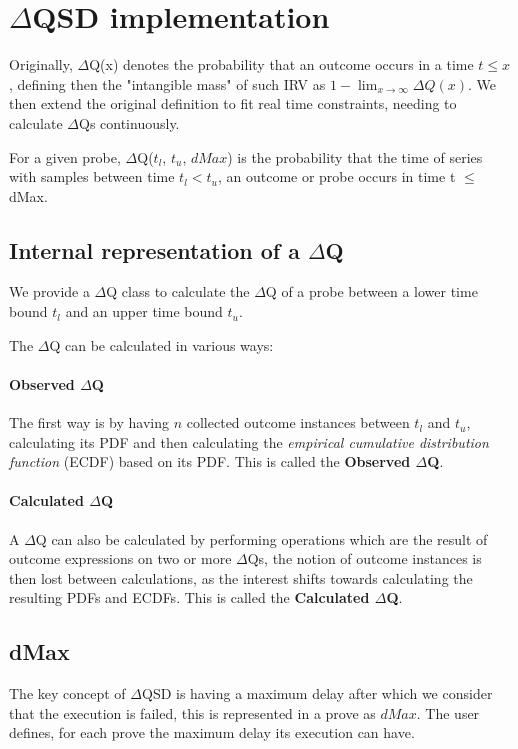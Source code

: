 \section{$\Delta$QSD implementation}

Originally, $\Delta$Q(x) denotes the probability that an outcome occurs in a time $t \le x$, defining then the "intangible mass" of such IRV as $1 - \lim_{x\to\infty} \Delta Q (x)$.
We then extend the original definition to fit real time constraints, needing to calculate $\Delta$Qs continuously.

For a given probe, $\Delta$Q($t_l$, $t_u$, $dMax$) is the probability that the time of series with samples between time $t_l < t_u$, an outcome or probe occurs in time t $\le$ dMax.

\subsection{Internal representation of a $\Delta$Q}
    We provide a $\Delta$Q class to calculate the $\Delta$Q of a probe between a lower time bound $t_l$ and an upper time bound $t_u$.
    
    The $\Delta$Q can be calculated in various ways: 
    
    \paragraph{Observed $\Delta$Q}
    
    The first way is by having $n$ collected outcome instances between $t_l$ and $t_u$, calculating its PDF and then calculating the \textit{empirical cumulative distribution function} (ECDF) based on its PDF. This is called the \textbf{Observed $\Delta$Q}.
    
    \paragraph{Calculated $\Delta$Q}
    
    A $\Delta$Q can also be calculated by performing operations which are the result of outcome expressions on two or more $\Delta$Qs, the notion of outcome instances is then lost between calculations, as the interest shifts towards calculating the resulting PDFs and ECDFs. This is called the \textbf{Calculated $\Delta$Q}.
    
    \subsection{dMax}
        The key concept of $\Delta$QSD is having a maximum delay after which we consider that the execution is failed, this is represented in a prove as $dMax$. The user defines, for each prove the maximum delay its execution can have.

